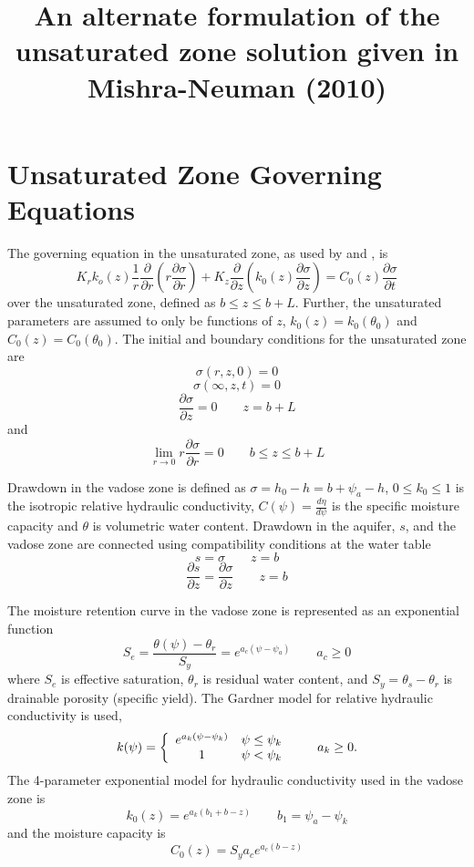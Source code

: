 \documentclass[11pt]{article}
\title{An alternate formulation of the unsaturated zone solution given in Mishra-Neuman (2010)}
\begin{document}
\maketitle
\section{Unsaturated Zone Governing Equations}
The governing equation in the unsaturated zone, as used by \cite{mishra10} and \cite{tartakovsky07}, is
\begin{equation}
  \label{eq:unsatDim}
  K_r k_o(z) \frac{1}{r} \frac{\partial}{\partial r} \left( r\frac{\partial \sigma}{\partial r} \right) + K_z \frac{\partial}{\partial z} \left( k_0(z) \frac{\partial \sigma}{\partial z}\right) = C_0(z) \frac{\partial \sigma}{\partial t}
\end{equation}
over the unsaturated zone, defined as $b \le z \le b+L$.  Further, the unsaturated parameters are assumed to only be functions of $z$, $k_0(z)=k_0(\theta_0)$ and $C_0(z)=C_0(\theta_0)$.  The initial and boundary conditions for the unsaturated zone are  
$$\sigma(r,z,0) = 0$$
$$\sigma(\infty,z,t)=0$$
$$\frac{\partial \sigma}{\partial z}=0 \qquad z=b+L$$ and 
$$\lim_{r \rightarrow 0} r \frac{\partial \sigma}{\partial r} = 0 \qquad b\le z \le b+L$$

Drawdown in the vadose zone is defined as $\sigma = h_0 - h=b+\psi_a - h$, $0 \le k_0 \le 1$ is the isotropic relative hydraulic conductivity, $C(\psi)=\frac{d\eta}{d \psi}$ is the specific moisture capacity and $\theta$ is volumetric water content.  Drawdown in the aquifer, $s$, and the vadose zone are connected using compatibility conditions at the water table
$$s=\sigma \qquad z=b$$
$$\frac{\partial s}{\partial z}=\frac{\partial \sigma}{\partial z} \qquad z=b$$ 

The moisture retention curve in the vadose zone is represented as an exponential function
$$S_e = \frac{\theta(\psi) - \theta_r}{S_y} = e^{a_c \left( \psi - \psi_a \right)} \qquad a_c \ge 0 $$
where $S_e$ is effective saturation, $\theta_r$ is residual water content, and $S_y=\theta_s - \theta_r$ is drainable porosity (specific yield).  The Gardner model for relative hydraulic conductivity is used,
\begin{equation}
  \nonumber
  k(\psi) = \left  \{ 
    \begin{array}{c c}
      e^{a_k \left( \psi - \psi_k\right)} & \psi \le \psi_k \\
      1 & \psi < \psi_k\\
    \end{array} 
\right . \qquad a_k \ge 0.
\end{equation}
The 4-parameter exponential model for hydraulic conductivity used in the vadose zone is 
\begin{equation}
  \label{eq:Gardner}
 k_0(z)=e^{a_k\left( b_1 + b - z\right)} \qquad b_1=\psi_a-\psi_k
\end{equation}
and the moisture capacity is
\begin{equation}
  \label{eq:mrc}
C_0(z) = S_y a_c e^{a_c \left( b-z\right)}
\end{equation}
\end{document}
